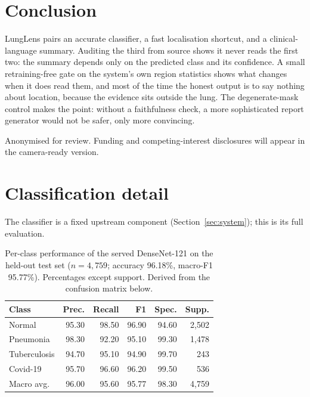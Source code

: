 \documentclass{article}
\begin{document}
\section{Conclusion}
\label{sec:conclusion}
LungLens pairs an accurate classifier, a fast localisation shortcut, and a clinical-language summary. Auditing the third from source shows it never reads the first two: the summary depends only on the predicted class and its confidence. A small retraining-free gate on the system's own region statistics shows what changes when it does read them, and most of the time the honest output is to say nothing about location, because the evidence sits outside the lung. The degenerate-mask control makes the point: without a faithfulness check, a more sophisticated report generator would not be safer, only more convincing.

\begin{ack}
Anonymised for review. Funding and competing-interest disclosures will appear in the camera-ready version.
\end{ack}

{\small


}

\appendix

\section{Classification detail}
\label{app:classification}

The classifier is a fixed upstream component (Section~\ref{sec:system}); this is its full evaluation.

\begin{table}[h]
\centering
\caption{Per-class performance of the served DenseNet-121 on the held-out test set ($n=4{,}759$; accuracy 96.18\%, macro-F1 95.77\%). Percentages except support. Derived from the confusion matrix below.}
\label{tab:perclass}
\begin{tabular}{lrrrrr}
\toprule
Class & Prec. & Recall & F1 & Spec. & Supp. \\
\midrule
Normal       & 95.30 & 98.50 & 96.90 & 94.60 & 2{,}502 \\
Pneumonia    & 98.30 & 92.20 & 95.10 & 99.30 & 1{,}478 \\
Tuberculosis & 94.70 & 95.10 & 94.90 & 99.70 & 243 \\
Covid-19     & 95.70 & 96.60 & 96.20 & 99.50 & 536 \\
\midrule
Macro avg.   & 96.00 & 95.60 & 95.77 & 98.30 & 4{,}759 \\
\bottomrule
\end{tabular}
\end{table}
\end{document}
